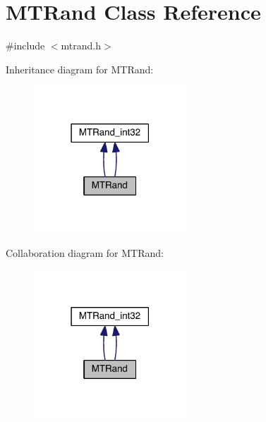 \hypertarget{a00015}{\section{M\+T\+Rand Class Reference}
\label{a00015}
}


{\ttfamily \#include $<$mtrand.\+h$>$}



Inheritance diagram for M\+T\+Rand\+:\nopagebreak
\begin{figure}[H]
\begin{center}
\leavevmode
\includegraphics[width=162pt]{a00215}
\end{center}
\end{figure}


Collaboration diagram for M\+T\+Rand\+:\nopagebreak
\begin{figure}[H]
\begin{center}
\leavevmode
\includegraphics[width=162pt]{a00216}
\end{center}
\end{figure}

